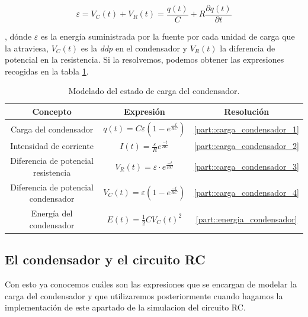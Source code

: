 \documentclass[../main.tex]{subfiles}
\begin{document}
\begin{equation}
    \varepsilon = V_C(t) + V_R(t) = \frac{q(t)}{C} + R\frac{\partial q(t)}{\partial t}
    \label{eqq::balance_energetico_rc_1}
\end{equation}

, dónde $\varepsilon$ es la energía suministrada por la fuente por cada unidad de carga que la atraviesa, $V_C(t)$ es la \textit{ddp} en el condensador y $V_R(t)$ la diferencia de potencial en la resistencia. Si la resolvemos, podemos obtener las expresiones recogidas en la tabla \ref{tab::ecuaciones_carga_rc}.


\begin{table}[!ht]
    \begin{center}
        \begin{tabular}{|| c | c | c ||}
            \hline
            \textbf{Concepto} & \textbf{Expresión} &  \textbf{Resolución}\\ \hline
            Carga del condensador & $q(t) = C\varepsilon \left( 1 - e^{\frac{-t}{RC}} \right)$ & \ref{part::carga_condensador_1} \\
            Intensidad de corriente & $I(t) = \frac{\varepsilon}{R}e^{\frac{-t}{RC}}$ & \ref{part::carga_condensador_2} \\
            Diferencia de potencial resistencia & $V_R(t) = \varepsilon \cdot e^{\frac{-t}{RC}}$ & \ref{part::carga_condensador_3} \\ 
            Diferencia de potencial condensador & $V_C(t) = \varepsilon \left(1- e^{\frac{-t}{RC}}\right)$ & \ref{part::carga_condensador_4} \\ 
            Energía del condensador & $E(t) = \frac{1}{2}CV_C(t)^2 $ & \ref{part::energia_condensador}
            \\
            \hline
            \end{tabular}
            \caption{Modelado del estado de carga del condensador.}
            \label{tab::ecuaciones_carga_rc}
    \end{center}
\end{table}





\subsection{El condensador y el circuito RC}




    
Con esto ya conocemos cuáles son las expresiones que se encargan de modelar la carga del condensador y que utilizaremos posteriormente cuando hagamos la implementación de este apartado de la simulacion del circuito RC. \\
\end{document}
